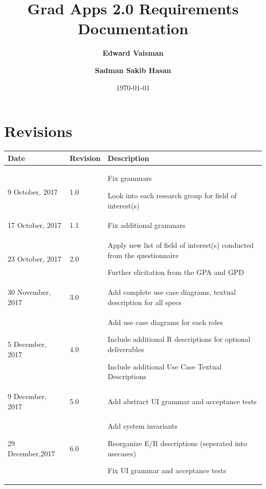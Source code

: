 \documentclass[fontsize=12pt,paper=letter,twoside]{scrartcl}
\author{\textbf{Edward Vaisman}
\and \textbf{Sadman Sakib Hasan}
}
\date{\today} %
\begin{document}
\title{Grad Apps 2.0 Requirements Documentation}
\maketitle

\newpage
\clearpage
\section*{Revisions}

\begin{tabular}{|l|l|p{3.5in}|}
\hline
Date & Revision & Description \\ 
\hline
9 October, 2017
& 1.0
& \begin{mylist}
\item Fix grammars
\item Look into each research group for field of interest(s)
\end{mylist} \\
\hline
17 October, 2017
& 1.1
& Fix additional grammars \\
\hline
23 October, 2017
& 2.0
& \begin{mylist}
\item Apply new list of field of interest(s) conducted from the questionnaire
\item Further elicitation from the GPA and GPD
\end{mylist} \\ 
\hline
30 November, 2017
& 3.0
& Add complete use case diagrams, textual description for all specs \\ 
\hline
5 December, 2017
& 4.0
& \begin{mylist}
\item Add use case diagrams for each roles
\item Include additional R descriptions for optional deliverables
\item Include additional Use Case Textual Descriptions
\end{mylist} \\  
\hline
9 December, 2017
& 5.0
& Add abstract UI grammar and acceptance tests \\
\hline
29 December,2017
& 6.0
& \begin{mylist}
\item Add system invariants
\item Reorganize E/R descriptions (seperated into usecases)
\item Fix UI grammar and acceptance tests
\end{mylist} \\  

\end{tabular}
\end{document}
